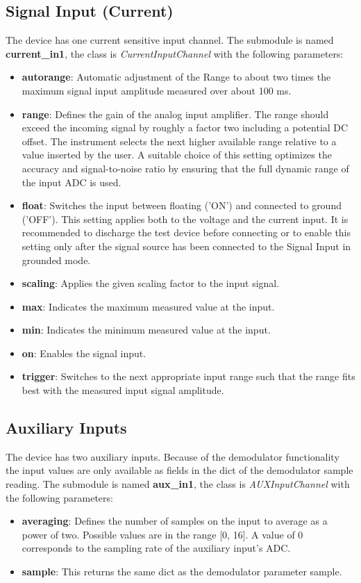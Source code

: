 \documentclass[11pt]{article} %
\begin{document}
\subsection{Signal Input (Current)}
The device has one current sensitive input channel. The submodule is named {\bf current\_in1}, the class is {\it CurrentInputChannel} with the following parameters:
\begin{itemize}
\item {\bf autorange}: Automatic adjustment of the Range to about two times the maximum signal input amplitude measured over about 100 ms.
\item {\bf range}: Defines the gain of the analog input amplifier. The range should exceed the incoming signal by roughly a factor two including a potential DC offset. The instrument selects the next higher available range relative to a value inserted by the user. A suitable choice of this setting optimizes the accuracy and signal-to-noise ratio by ensuring that the full dynamic range of the input ADC is used.
\item {\bf float}: Switches the input between floating ('ON') and connected to ground ('OFF'). This setting applies both to the voltage and the current input. It is recommended to discharge the test device before connecting or to enable this setting only after the signal source has been connected to the Signal Input in grounded mode.
\item {\bf scaling}: Applies the given scaling factor to the input signal.
\item {\bf max}: Indicates the maximum measured value at the input.
\item {\bf min}: Indicates the minimum measured value at the input.
\item {\bf on}: Enables the signal input.
\item {\bf trigger}: Switches to the next appropriate input range such that the range fits best with the measured input signal amplitude.
\end{itemize}


\subsection{Auxiliary Inputs}
The device has two auxiliary inputs. Because of the demodulator functionality the input values are only available as fields in the dict of the demodulator sample reading. The submodule is named {\bf aux\_in1}, the class is {\it AUXInputChannel} with the following parameters:
\begin{itemize}
\item {\bf averaging}: Defines the number of samples on the input to average as a power of two. Possible values are in the range [0, 16]. A value of 0 corresponds to the sampling rate of the auxiliary input's ADC.
\item {\bf sample}: This returns the same dict as the demodulator parameter sample.
\end{itemize}
\end{document}
